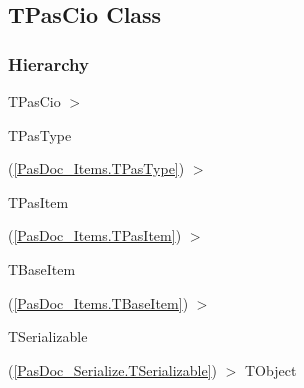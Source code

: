 \documentclass{report}
\begin{document}
\subsection*{TPasCio Class}
\fi
\label{PasDoc_Items.TPasCio}
\subsubsection*{\large{\textbf{Hierarchy}}\normalsize\hspace{1ex}\hfill}
TPasCio {$>$} \begin{ttfamily}TPasType\end{ttfamily}(\ref{PasDoc_Items.TPasType}) {$>$} \begin{ttfamily}TPasItem\end{ttfamily}(\ref{PasDoc_Items.TPasItem}) {$>$} \begin{ttfamily}TBaseItem\end{ttfamily}(\ref{PasDoc_Items.TBaseItem}) {$>$} \begin{ttfamily}TSerializable\end{ttfamily}(\ref{PasDoc_Serialize.TSerializable}) {$>$} 
TObject
\end{document}
